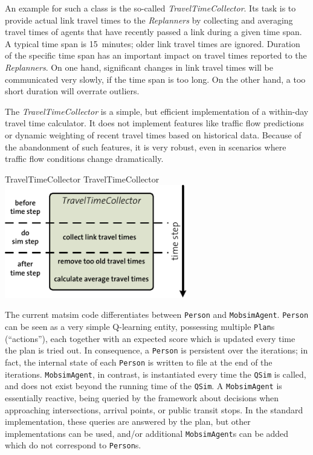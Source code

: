 An example for such a class is the so-called \emph{TravelTimeCollector}. Its task is to provide actual link travel times to the \emph{Replanners} by collecting and averaging travel times of agents that have recently passed a link during a given time span. A typical time span is 15~minutes; older link travel times are ignored. Duration of the specific time span has an important impact on travel times reported to the \emph{Replanners}. On one hand, significant changes in link travel times will be communicated very slowly, if the time span is too long. On the other hand, a too short duration will overrate outliers.

The \emph{TravelTimeCollector} is a simple, but efficient implementation of a within-day travel time calculator. It does not implement features like traffic flow predictions or dynamic weighting of recent travel times based on historical data. 
Because of the abandonment of such features, it is very robust, even in scenarios where traffic flow conditions change dramatically.

\createfigure%
{TravelTimeCollector}%
{TravelTimeCollector}%
{\label{fig:labelTravelTimeCollector}}%
{\includegraphics[width=8.0cm, angle=0]{extending/figures/WithinDayReplanning/TravelTimeCollector}}%
{}


The current \acrshort{matsim} code differentiates between \lstinline$Person$ and \lstinline$MobsimAgent$.  
%
\lstinline$Person$ can be seen as a very simple Q-learning entity, possessing multiple \lstinline$Plan$s (``actions''), each together with an expected score which is updated every time the plan is tried out.  In consequence, a \lstinline$Person$ is persistent over the iterations; in fact, the internal state of each \lstinline$Person$ is written to file at the end of the iterations.
%
\lstinline$MobsimAgent$, in contrast, is instantiated every time the \lstinline$QSim$ is called, and does not exist beyond the running time of the \lstinline$QSim$.  A \lstinline$MobsimAgent$ is essentially reactive, being queried by the framework about decisions when approaching intersections, arrival points, or public transit stops.  In the standard implementation, these queries are answered by the plan, but other implementations can be used, and/or additional \lstinline$MobsimAgent$s can be added which do not correspond to \lstinline$Person$s.

